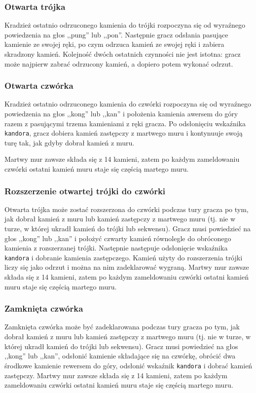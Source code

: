 \subsubsection{Otwarta trójka}
Kradzież ostatnio odrzuconego kamienia do trójki rozpoczyna się od wyraźnego
powiedzenia na głos ,,pung'' lub ,,pon''.
Następnie gracz odsłania pasujące kamienie ze swojej ręki, po czym odrzuca
kamień ze swojej ręki i zabiera skradzony kamień.
Kolejność dwóch ostatnich czynności nie jest istotna: gracz może najpierw zabrać
odrzucony kamień, a dopiero potem wykonać odrzut.

\subsubsection{Otwarta czwórka}
Kradzież ostatnio odrzuconego kamienia do czwórki rozpoczyna się od wyraźnego
powiedzenia na głos ,,kong'' lub ,,kan'' i położenia kamienia awersem do góry
razem z pasującymi trzema kamieniami z ręki gracza.
Po odsłonięciu wskaźnika \texttt{kandora}, gracz dobiera kamień zastępczy z martwego muru
i kontynuuje swoją turę tak, jak gdyby dobrał kamień z muru.

Martwy mur zawsze składa się z 14 kamieni, zatem po każdym zameldowaniu czwórki
ostatni kamień muru staje się częścią martego muru.

\subsubsection{Rozszerzenie otwartej trójki do czwórki}
Otwarta trójka może zostać rozszerzona do czwórki podczas tury gracza po tym,
jak dobrał kamień z muru lub kamień zastępczy z martwego muru (tj. nie w turze,
w której ukradł kamień do trójki lub sekwensu).
Gracz musi powiedzieć na głos ,,kong'' lub ,,kan'' i położyć czwarty kamień
równolegle do obróconego kamienia z rozszerzanej trójki.
Następnie następuje odsłonięcie wskaźnika \texttt{kandora} i dobranie kamienia
zastępczego.
Kamień użyty do rozszerzenia trójki liczy się jako odrzut i można na nim
zadeklarować wygraną.
Martwy mur zawsze składa się z 14 kamieni, zatem po każdym zameldowaniu czwórki
ostatni kamień muru staje się częścią martego muru.

\subsubsection{Zamknięta czwórka}
Zamknięta czwórka może być zadeklarowana podczas tury gracza po tym, jak dobrał
kamień z muru lub kamień zastępczy z martwego muru (tj. nie w turze, w której
ukradł kamień do trójki lub sekwensu).
Gracz musi powiedzieć na głos ,,kong'' lub ,,kan'', odsłonić kamienie składające
się na czwórkę, obrócić dwa środkowe kamienie rewersem do góry, odsłonić
wskaźnik \texttt{kandora} i dobrać kamień zastępczy.
Martwy mur zawsze składa się z 14 kamieni, zatem po każdym zameldowaniu czwórki
ostatni kamień muru staje się częścią martego muru.

